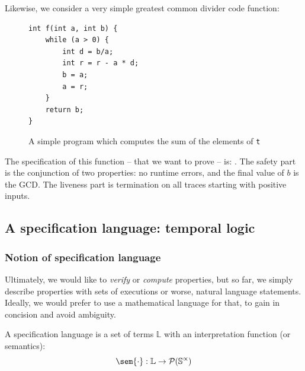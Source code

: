 \documentclass[toc]{../cs-classes/cs-classes}
\begin{document}
\begin{example}
    Likewise, we consider a very simple greatest common divider code function:
    \begin{figure}[!ht]
        \centering 
        \begin{minipage}{0.2\textwidth}
            \begin{verbatim}
int f(int a, int b) {
    while (a > 0) {
        int d = b/a;
        int r = r - a * d;
        b = a;
        a = r;
    }
    return b;
}
            \end{verbatim}
        \end{minipage}
        \caption{A simple program which computes the sum of the elements of \texttt{t}}
    \end{figure}

    The specification of this function -- that we want to prove -- is: . The safety part is the conjunction of two properties: no runtime errors, and the final value of $b$ is the GCD. The liveness part is termination on all traces starting with positive inputs.
\end{example}

\subsection{A specification language: temporal logic}
\subsubsection{Notion of specification language}
Ultimately, we would like to \emph{verify} or \emph{compute} properties, but so far, we simply describe properties with sets of executions or worse, natural language statements. Ideally, we would prefer to use a mathematical language for that, to gain in concision and avoid ambiguity.

\begin{definition}
    A specification language is a set of terms $\mathbb{L}$ with an interpretation function (or semantics):
    \begin{equation*}
        \sem{\cdot} : \mathbb{L} \to \mathcal{P}(\S^\propto)
    \end{equation*}
\end{definition}
\end{document}
